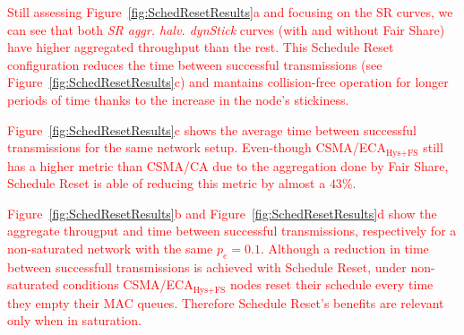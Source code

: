 	\textcolor{red}{Still assessing Figure~\ref{fig:SchedResetResults}a and focusing on the SR curves, we can see that both \emph{SR aggr. halv. dynStick} curves (with and without Fair Share) have higher aggregated throughput than the rest. This Schedule Reset configuration reduces the time between successful transmissions (see Figure~\ref{fig:SchedResetResults}c) and mantains collision-free operation for longer periods of time thanks to the increase in the node's stickiness.}
	
	\textcolor{red}{Figure~\ref{fig:SchedResetResults}c shows the average time between successful transmissions for the same network setup. Even-though CSMA/ECA$_{\text{Hys+FS}}$ still has a higher metric than CSMA/CA due to the aggregation done by Fair Share, Schedule Reset is able of reducing this metric by almost a $43\%$.}
	
	\textcolor{red}{Figure~\ref{fig:SchedResetResults}b and Figure~\ref{fig:SchedResetResults}d show the aggregate througput and time between successful transmissions, respectively for a non-saturated network with the same $p_e=0.1$. Although a reduction in time between successfull transmissions is achieved with Schedule Reset, under non-saturated conditions CSMA/ECA$_{\text{Hys+FS}}$ nodes reset their schedule every time they empty their MAC queues. Therefore Schedule Reset's benefits are relevant only when in saturation.}
	
	
	
%	
